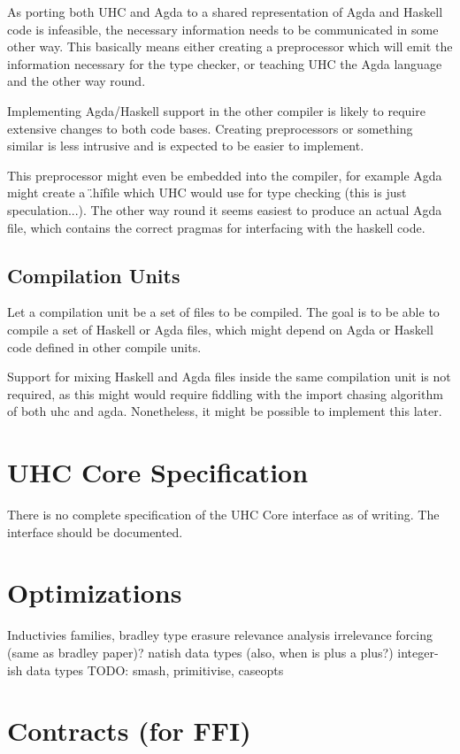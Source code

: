 \documentclass[12pt, a4paper, twoside]{report}
\begin{document}
As porting both UHC and Agda to a shared representation of Agda and Haskell code
is infeasible, the necessary information needs to be communicated in some other way.
This basically means either creating a preprocessor which will emit the information
necessary for the type checker, or teaching UHC the Agda language and the other way round.

Implementing Agda/Haskell support in the other compiler is likely to require extensive changes
to both code bases. Creating preprocessors or something similar is less intrusive and is expected
to be easier to implement.

This preprocessor might even be embedded into the compiler, for example Agda might create
a \".hi\" file which UHC would use for type checking (this is just speculation...). The other way round it seems easiest to
produce an actual Agda file, which contains the correct pragmas for interfacing with the haskell code.

\subsection{Compilation Units}
Let a compilation unit be a set of files to be compiled. The goal is to be able to compile a set of
Haskell or Agda files, which might depend on Agda or Haskell code defined in other compile units.

Support for mixing Haskell and Agda files inside the same compilation unit is not required, as this
might would require fiddling with the import chasing algorithm of both uhc and agda. Nonetheless,
it might be possible to implement this later.

\section{UHC Core Specification}
There is no complete specification of the UHC Core interface as of writing. The interface
should be documented.

\section{Optimizations}
Inductivies families, bradley
type erasure
relevance analysis
irrelevance
forcing (same as bradley paper)?
natish data types (also, when is plus a plus?)
integer-ish data types
TODO: smash, primitivise, caseopts

\section{Contracts (for FFI)}
\end{document}
